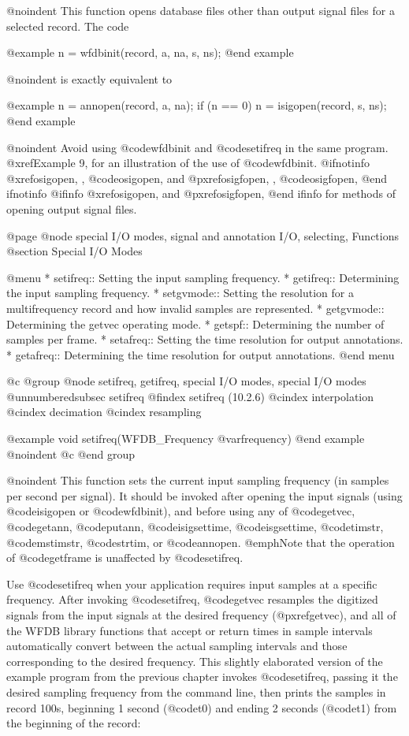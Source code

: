{{{{{{{{@noindent
This function opens database files other than output signal
files for a selected record.  The code

@example
n = wfdbinit(record, a, na, s, ns);
@end example

@noindent
is exactly equivalent to

@example
n = annopen(record, a, na);
if (n == 0)
    n = isigopen(record, s, ns);
@end example

@noindent
Avoid using @code{wfdbinit} and @code{setifreq} in the same program.
@xref{Example 9}, for an illustration of the use of @code{wfdbinit}.
@ifnotinfo
@xref{osigopen, , @code{osigopen}}, and @pxref{osigfopen, , @code{osigfopen}},
@end ifnotinfo
@ifinfo
@xref{osigopen}, and @pxref{osigfopen},
@end ifinfo
for methods of opening output signal files.

@page
@node     special I/O modes, signal and annotation I/O, selecting, Functions
@section Special I/O Modes

@menu
* setifreq::			Setting the input sampling frequency.
* getifreq::                    Determining the input sampling frequency.
* setgvmode::                   Setting the resolution for a multifrequency
                                record and how invalid samples are represented.
* getgvmode::                   Determining the getvec operating mode.
* getspf::                      Determining the number of samples per frame.
* setafreq::			Setting the time resolution for output
                                annotations.
* getafreq::                    Determining the time resolution for output
                                annotations.
@end menu

@c @group
@node     setifreq, getifreq, special I/O modes, special I/O modes
@unnumberedsubsec setifreq
@findex setifreq (10.2.6)
@cindex interpolation
@cindex decimation
@cindex resampling

@example
void setifreq(WFDB_Frequency @var{frequency})
@end example
@noindent
@c @end group

@noindent
This function sets the current input sampling frequency (in samples per
second per signal).  It should be invoked after opening the input
signals (using @code{isigopen} or @code{wfdbinit}), and before using any
of @code{getvec}, @code{getann}, @code{putann}, @code{isigsettime},
@code{isgsettime}, @code{timstr}, @code{mstimstr}, @code{strtim},
or @code{annopen}.
@emph{Note that the operation of @code{getframe} is unaffected by
@code{setifreq}.}

Use @code{setifreq} when your application requires input samples at a
specific frequency.  After invoking @code{setifreq}, @code{getvec}
resamples the digitized signals from the input signals at the desired
frequency (@pxref{getvec}), and all of the WFDB library functions that
accept or return times in sample intervals automatically convert between
the actual sampling intervals and those corresponding to the desired
frequency.  This slightly elaborated version of the example program from
the previous chapter invokes @code{setifreq}, passing it the desired sampling
frequency from the command line, then prints the samples in record 100s,
beginning 1 second (@code{t0}) and ending 2 seconds (@code{t1}) from the
beginning of the record:

}}}}}}}}

